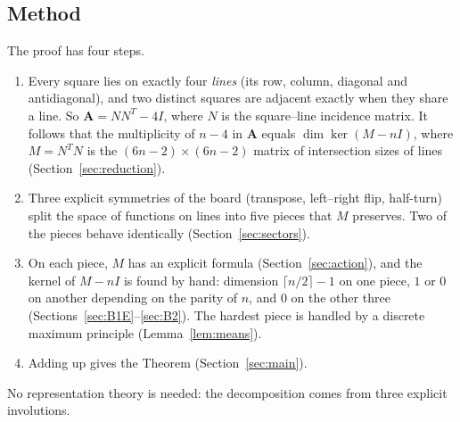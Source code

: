 \documentclass[11pt]{amsart}
\theoremstyle{plain}
\theoremstyle{definition}
\theoremstyle{remark}
\numberwithin{equation}{section}
\newcommand{\Adj}{\mathbf{A}}          %
\begin{document}
\subsection{Method}
The proof has four steps.
\begin{enumerate}
\item Every square lies on exactly four \emph{lines} (its row, column, diagonal and
antidiagonal), and two distinct squares are adjacent exactly when they share a line.
So \(\Adj=NN^{T}-4I\), where \(N\) is the square--line incidence matrix. It follows that
the multiplicity of \(n-4\) in \(\Adj\) equals \(\dim\ker(M-nI)\), where \(M=N^{T}N\) is
the \((6n-2)\times(6n-2)\) matrix of intersection sizes of lines
(Section~\ref{sec:reduction}).
\item Three explicit symmetries of the board (transpose, left--right flip, half-turn)
split the space of functions on lines into five pieces that \(M\) preserves. Two of the
pieces behave identically (Section~\ref{sec:sectors}).
\item On each piece, \(M\) has an explicit formula (Section~\ref{sec:action}), and the
kernel of \(M-nI\) is found by hand: dimension \(\lceil n/2\rceil-1\) on one piece,
\(1\) or \(0\) on another depending on the parity of \(n\), and \(0\) on the other three
(Sections~\ref{sec:B1E}--\ref{sec:B2}). The hardest piece is handled by a discrete
maximum principle (Lemma~\ref{lem:means}).
\item Adding up gives the Theorem (Section~\ref{sec:main}).
\end{enumerate}
No representation theory is needed: the decomposition comes from three explicit
involutions.
\end{document}
